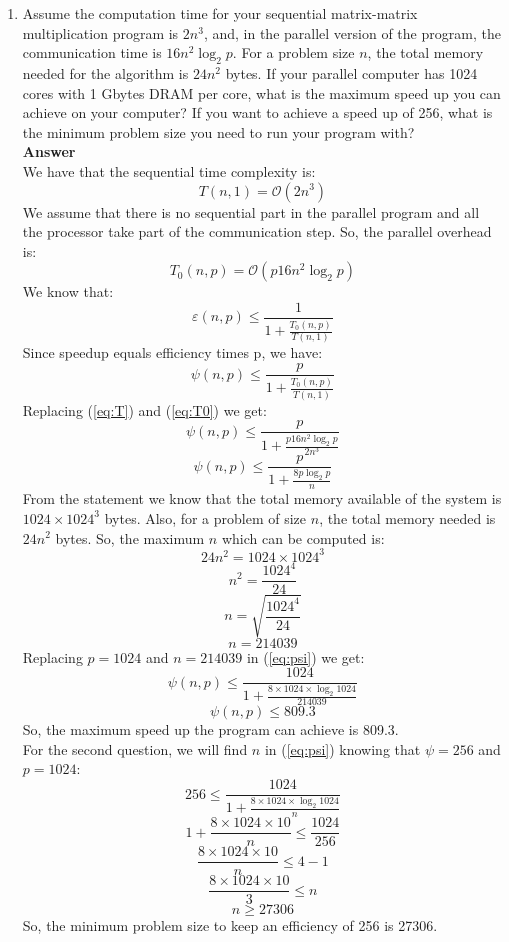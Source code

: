 \documentclass[10pt]{scrartcl}
\begin{document}
\begin{enumerate}
 \item Assume the computation time for your sequential matrix-matrix multiplication program is $2n^3$, and, in the parallel version of the program, the communication time is $16n^2\log_2p$. For a problem size $n$, the total memory needed for the algorithm is $24n^2$ bytes. If your parallel computer has 1024 cores with 1 Gbytes DRAM per core, what is the maximum speed up you can achieve on your computer? If you want to achieve a speed up of 256, what is the minimum problem size you need to run your program with?
 \\ 
 \textbf{Answer}
 \\
 We have that the sequential time complexity is:
 \begin{equation} \label{eq:T}
  T(n,1) = \mathcal{O}(2n^3)
 \end{equation}
 We assume that there is no sequential part in the parallel program and all the processor take part of the communication step.  So, the parallel overhead is:
 \begin{equation} \label{eq:T0}
  T_0(n,p) = \mathcal{O}(p16n^2\log_2p)
 \end{equation}
 We know that:
 $$\varepsilon(n,p) \leq \frac{1}{1 + \frac{T_0(n,p)}{T(n,1)}}$$
 Since speedup equals efficiency times p, we have:
 $$\psi(n,p) \leq \frac{p}{1 + \frac{T_0(n,p)}{T(n,1)}}$$
 Replacing (\ref{eq:T}) and (\ref{eq:T0}) we get:
 $$\psi(n,p) \leq \frac{p}{1 + \frac{p16n^2\log_2p}{2n^3}}$$
 \begin{equation} \label{eq:psi}
  \psi(n,p) \leq \frac{p}{1 + \frac{8p\log_2p}{n}}
 \end{equation}
 From the statement we know that the total memory available of the system is $1024\times1024^3$ bytes.  Also, for a problem of size $n$, the total memory needed is $24n^2$ bytes. So, the maximum $n$ which can be computed is:
 $$24n^2 = 1024\times1024^3$$
 $$n^2 = \frac{1024^4}{24}$$
 $$n = \sqrt{\frac{1024^4}{24}}$$
 $$n = 214039$$
 Replacing $p = 1024$ and $n = 214039$ in (\ref{eq:psi}) we get:
 $$\psi(n,p) \leq \frac{1024}{1 + \frac{8 \times 1024 \times \log_2 1024}{214039}}$$
 $$\psi(n,p) \leq 809.3$$
 So, the maximum speed up the program can achieve is 809.3.
 \\
 For the second question, we will find $n$ in (\ref{eq:psi}) knowing that $\psi = 256$ and $p = 1024$:
 $$256 \leq \frac{1024}{1 + \frac{8 \times 1024 \times \log_2 1024}{n}}$$
 $$1 + \frac{8 \times 1024 \times 10}{n} \leq \frac{1024}{256}$$
 $$\frac{8 \times 1024 \times 10}{n} \leq 4 - 1$$
 $$\frac{8 \times 1024 \times 10}{3} \leq n$$
 $$n \geq 27306$$
 So, the minimum problem size to keep an efficiency of 256 is 27306.
 
 
\end{enumerate}
\end{document}
